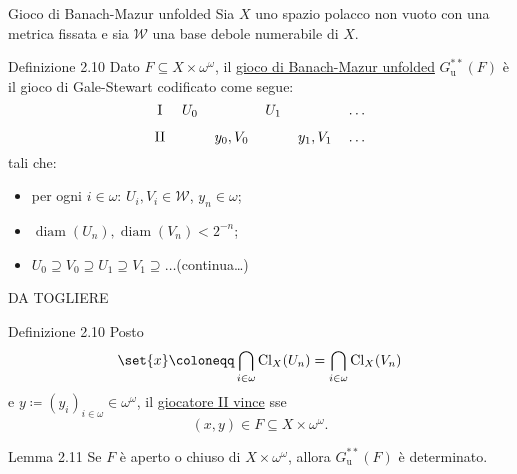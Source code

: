 \documentclass[babel]{beamer}
\renewcommand{\href}[2]{#2}
\begin{document}
\begin{frame}[label={sec:org0d40b40}]{Gioco di Banach-Mazur unfolded}
Sia \(X\) uno \href{../../../../../../../org/roam/20250301194013-spazio_polacco.org}{spazio polacco} non vuoto con una \href{../../../../../../../org/roam/20250301193511-spazio_metrico.org}{metrica} fissata e sia \(\mathcal{W}\) una \href{../../../../../../../org/roam/20250525113346-base_debole_di_uno_spazio_topologico.org}{base debole} \href{../../../../../../../org/roam/20250111143651-insieme_numerabile.org}{numerabile} di \(X\).
\begin{block}{Definizione 2.10}
Dato \(F \subseteq X\times \omega^{\omega}\), il \uline{gioco di Banach-Mazur unfolded} \(G^{**}_{\text{u}}(F)\) è il \href{../../../../../../../org/roam/20250513155732-logic_game.org}{gioco} \href{../../../../../../../org/roam/20250513171520-giochi_di_gale_stewart.org}{di Gale-Stewart} codificato come segue:
\begin{equation*}
\begin{tikzcd}[ampersand replacement=\&,cramped,sep=tiny]
	{\text{I}} \& {U_0} \&\& {U_1} \&\& \dots \\
	{\text{II}} \&\& {y_0,V_0} \&\& {y_1, V_{1}} \& \dots
\end{tikzcd}
\end{equation*}
tali che:
\begin{itemize}
\item per ogni \(i \in \omega\): \(U_{i}, V_{i} \in \mathcal{W}\), \(y_{n} \in \omega\);
\item \(\operatorname{diam}(U_{n}), \operatorname{diam}(V_{n}) < 2^{-n}\);
\item \(U_{0}\supseteq V_{0}\supseteq U_{1}\supseteq V_{1}\supseteq \dots\)\hfill (continua\dots{})
\end{itemize}
\end{block}
\end{frame}
\begin{frame}[label={sec:org5b7f218}]{DA TOGLIERE}
\begin{block}{Definizione 2.10}
Posto
\begin{equation*}
\set{x}\coloneqq\bigcap_{i \in \omega} \operatorname{Cl}_{X}(U_{n}) = \bigcap_{i \in \omega} \operatorname{Cl}_{X}(V_{n})
\end{equation*}
e \(y\coloneqq (y_{i})_{i \in \omega} \in \omega^{\omega}\), il \uline{giocatore II vince} sse
\begin{equation*}
(x,y) \in F \subseteq X\times \omega^{\omega}.
\end{equation*}
\end{block}
\begin{alertblock}{Lemma 2.11}
Se \(F\) è aperto o chiuso di \(X\times\omega^{\omega}\), allora \(G^{**}_{\text{u}}(F)\) è determinato.
\end{alertblock}
\end{frame}
\end{document}
